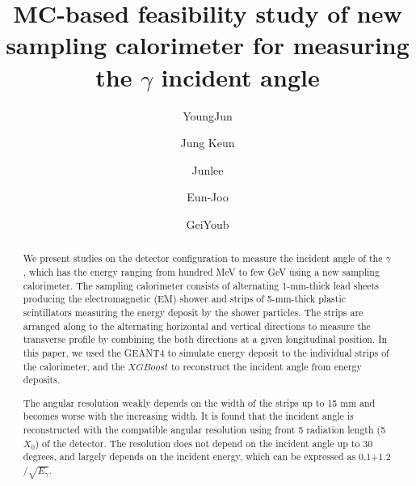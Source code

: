 \documentclass[jkps,preprint,fleqn,showpacs,showkeys]{revtex4}
\newcommand{\XGB}{XGBoost}
\begin{document}
\setcounter{page}{0}
\title[]{ MC-based feasibility study of new sampling calorimeter for measuring the $\gamma$ incident angle }

\author{YoungJun }
\author{Jung Keun }
\author{Junlee }
\author{Eun-Joo }
\author{GeiYoub  }


\begin{abstract}
We present studies on the detector configuration to measure the incident angle of the $\gamma$, which has the energy ranging from hundred MeV to few GeV using a new sampling calorimeter. The sampling calorimeter consists of alternating 1-mm-thick lead sheets producing the electromagnetic (EM) shower and strips of 5-mm-thick plastic scintillators measuring the energy deposit by the shower particles. The strips are arranged along to the alternating horizontal and vertical directions to measure the transverse profile by combining the both directions at a given longitudinal position. In this paper, we used the GEANT4 to simulate energy deposit to the individual strips of the calorimeter, and the $\XGB$ to reconstruct the incident angle from energy deposits. 

The angular resolution weakly depends on the width of the strips up to 15 mm and becomes worse with the increasing width. It is found that the incident angle is reconstructed with the compatible angular resolution using front 5 radiation length (5$X_{0}$) of the detector. The resolution does not depend on the incident angle up to 30 degrees, and largely depends on the incident energy, which can be expressed as 0.1+1.2$/ \sqrt{E_\gamma}$.

\end{abstract}

\maketitle
\end{document}
